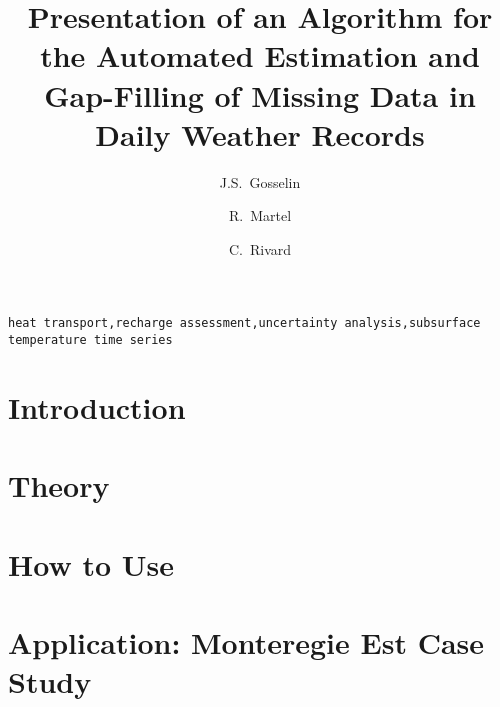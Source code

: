 \documentclass[3p, times, review]{elsarticle} %
\begin{document}
\begin{frontmatter}

\title{Presentation of an Algorithm for the Automated Estimation and Gap-Filling of Missing Data in Daily Weather Records}

\author[inrs]{J.S.~Gosselin}

\author[inrs]{R.~Martel}

\author[cgc]{C.~Rivard}


\address[inrs]{Institut national de la recherche scientifique, Centre Eau Terre Environnement,
490 rue de la Couronne, Quebec City, Quebec, Canada}
\address[cgc]{Geological Survey of Canada, Quebec Division, 490 rue de la Couronne, Quebec City, Quebec, Canada}

\begin{abstract}
	\vspace{-1em}
	
\end{abstract}

\begin{keyword}
\texttt{heat transport\sep recharge assessment\sep uncertainty analysis\sep subsurface temperature time series}
\end{keyword}

\end{frontmatter}

\linenumbers

\section{Introduction}
    

\section{Theory}
    
    
\section{How to Use}\label{sec:Howto}
    
    
\section{Application: Monteregie Est Case Study}\label{sec:MontEstCaseStudy}
    
\end{document}
